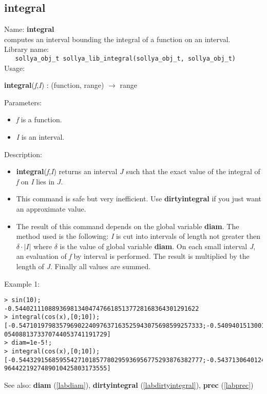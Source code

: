 \subsection{integral}
\label{labintegral}
\noindent Name: \textbf{integral}\\
\phantom{aaa}computes an interval bounding the integral of a function on an interval.\\[0.2cm]
\noindent Library name:\\
\verb|   sollya_obj_t sollya_lib_integral(sollya_obj_t, sollya_obj_t)|\\[0.2cm]
\noindent Usage: 
\begin{center}
\textbf{integral}(\emph{f},\emph{I}) : (\textsf{function}, \textsf{range}) $\rightarrow$ \textsf{range}\\
\end{center}
Parameters: 
\begin{itemize}
\item \emph{f} is a function.
\item \emph{I} is an interval.
\end{itemize}
\noindent Description: \begin{itemize}

\item \textbf{integral}(\emph{f},\emph{I}) returns an interval $J$ such that the exact value of 
   the integral of \emph{f} on \emph{I} lies in $J$.

\item This command is safe but very inefficient. Use \textbf{dirtyintegral} if you just want
   an approximate value.

\item The result of this command depends on the global variable \textbf{diam}.
   The method used is the following: \emph{I} is cut into intervals of length not 
   greater then $\delta \cdot |I|$ where $\delta$ is the value
   of global variable \textbf{diam}.
   On each small interval \emph{J}, an evaluation of \emph{f} by interval is
   performed. The result is multiplied by the length of \emph{J}. Finally all values 
   are summed.
\end{itemize}
\noindent Example 1: 
\begin{center}\begin{minipage}{15cm}\begin{Verbatim}[frame=single,commandchars=\\\|\~]
> sin(10);
-0.54402111088936981340474766185137728168364301291622
> integral(cos(x),[0;10]);
[-0.54710197983579690224097637163525943075698599257333;-0.5409401513001318384815
0540881373370744053741191729]
> diam=1e-5!;
> integral(cos(x),[0;10]);
[-0.54432915685955427101857780295936956775293876382777;-0.5437130640124996950803
9644221927489010425803173555]
\end{Verbatim}
\end{minipage}\end{center}
See also: \textbf{diam} (\ref{labdiam}), \textbf{dirtyintegral} (\ref{labdirtyintegral}), \textbf{prec} (\ref{labprec})
